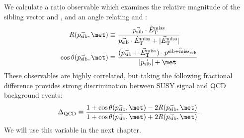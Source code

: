 We calculate a ratio observable which examines the relative magnitude of the sibling vector \psib and \met, and an angle relating \psib and \met:
\begin{align}
R( \psib, \met )          & \equiv \frac{\psib \cdot \methat}{ \psib \cdot \methat + |\metvec|} \\
\cos{\theta(\psib, \met)} & \equiv \frac{ (\psib + \metvec) \cdot \hat{p^{\text{sib+miss}_{sib}}}}{|\psib| + \met}
\end{align}
These observables are highly correlated, but taking the following fractional difference provides strong discrimination between SUSY signal and QCD background events:
\begin{align}
\Delta_{\mathrm{QCD}} \equiv \frac{1 + \cos{\theta(\psib, \met)} - 2 R(\psib, \met) }{1 + \cos{\theta(\psib, \met)} + 2 R(\psib, \met) }.
\end{align}
We will use this variable in the next chapter.

